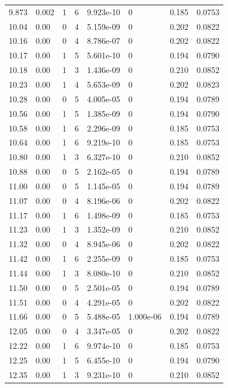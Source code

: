\documentclass[preview]{standalone}
\begin{document}
{{{\begin{tabular}{L{1.2cm}C{1.2cm} C{0.3cm}C{0.5cm} C{1.4cm}C{1.4cm} C{1.4cm}C{1.4cm}}
  9.873  &  0.002  & 1     &  6 &  9.923e-10  & 0  & 0.185 &  0.0753   \\ 
  10.04  &  0.00  & 0     &  4 &  5.159e-09  & 0  & 0.202 &  0.0822   \\ 
  10.16  &  0.00  & 0     &  4 &  8.786e-07  & 0  & 0.202 &  0.0822   \\ 
  10.17  &  0.00  & 1     &  5 &  5.601e-10  & 0  & 0.194 &  0.0790   \\ 
  10.18  &  0.00  & 1     &  3 &  1.436e-09  & 0  & 0.210 &  0.0852   \\ 
  10.23  &  0.00  & 1     &  4 &  5.653e-09  & 0  & 0.202 &  0.0823   \\ 
  10.28  &  0.00  & 0     &  5 &  4.005e-05  & 0  & 0.194 &  0.0789   \\ 
  10.56  &  0.00  & 1     &  5 &  1.385e-09  & 0  & 0.194 &  0.0790   \\ 
  10.58  &  0.00  & 1     &  6 &  2.296e-09  & 0  & 0.185 &  0.0753   \\ 
  10.64  &  0.00  & 1     &  6 &  9.219e-10  & 0  & 0.185 &  0.0753   \\ 
  10.80  &  0.00  & 1     &  3 &  6.327e-10  & 0  & 0.210 &  0.0852   \\ 
  10.88  &  0.00  & 0     &  5 &  2.162e-05  & 0  & 0.194 &  0.0789   \\ 
  11.00  &  0.00  & 0     &  5 &  1.145e-05  & 0  & 0.194 &  0.0789   \\ 
  11.07  &  0.00  & 0     &  4 &  8.196e-06  & 0  & 0.202 &  0.0822   \\ 
  11.17  &  0.00  & 1     &  6 &  1.498e-09  & 0  & 0.185 &  0.0753   \\ 
  11.23  &  0.00  & 1     &  3 &  1.352e-09  & 0  & 0.210 &  0.0852   \\ 
  11.32  &  0.00  & 0     &  4 &  8.945e-06  & 0  & 0.202 &  0.0822   \\ 
  11.42  &  0.00  & 1     &  6 &  2.255e-09  & 0  & 0.185 &  0.0753   \\ 
  11.44  &  0.00  & 1     &  3 &  8.080e-10  & 0  & 0.210 &  0.0852   \\ 
  11.50  &  0.00  & 0     &  5 &  2.501e-05  & 0  & 0.194 &  0.0789   \\ 
  11.51  &  0.00  & 0     &  4 &  4.291e-05  & 0  & 0.202 &  0.0822   \\ 
  11.66  &  0.00  & 0     &  5 &  5.488e-05  & 1.000e-06  & 0.194 &  0.0789   \\ 
  12.05  &  0.00  & 0     &  4 &  3.347e-05  & 0  & 0.202 &  0.0822   \\ 
  12.22  &  0.00  & 1     &  6 &  9.974e-10  & 0  & 0.185 &  0.0753   \\ 
  12.25  &  0.00  & 1     &  5 &  6.455e-10  & 0  & 0.194 &  0.0790   \\ 
  12.35  &  0.00  & 1     &  3 &  9.231e-10  & 0  & 0.210 &  0.0852   \\ 
\hline 
\end{tabular} 

}}}
\end{document}

